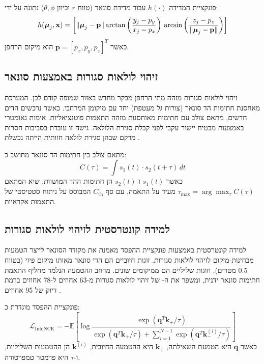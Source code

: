 פונקציית המדידה $h(\cdot)$ עבור מדידת סונאר (טווח $r$ וכיוון $\theta, \phi$) נתונה על ידי:
\begin{equation}
h(\boldsymbol{\mu}_j, \mathbf{x}) = \left[\| \boldsymbol{\mu}_j - \mathbf{p} \| \\ \arctan\left( \frac{y_j - p_y}{x_j - p_x} \right) \\ \arcsin\left( \frac{z_j - p_z}{\| \boldsymbol{\mu}_j - \mathbf{p} \|} \right)\right]
\label{eq:ch04_measurement_function}
\end{equation}
כאשר $\mathbf{p} = [p_x, p_y, p_z]^T$ הוא מיקום הרחפן.

\subsection{זיהוי לולאות סגורות באמצעות סונאר}
\label{sec:ch04_loop_closure}

זיהוי לולאות סגורות מזהה מתי הרחפן מבקר מחדש באזור שמופה קודם לכן. המערכת מאחסנת חתימות הד סונאר (צורות גל מעטפת) יחד עם מיקומן המרחבי. כאשר נרכשים הדים חדשים, מתאם צולב עם חתימות מאוחסנות מזהה התאמות פוטנציאליות. אימות גאומטרי באמצעות  מבטיח יישור עקבי לפני קבלת סגירת הלולאה. גישה זו עובדת בסביבות חסרות מרקם שבהן סגירת לולאה חזותית הייתה נכשלת \cite{Vanderelst2016PlaceRecognition}.

מתאם צולב בין חתימות הד סונאר מחושב כ:
\begin{equation}
C(\tau) = \int s_1(t) \cdot s_2(t + \tau) \, dt
\label{eq:ch04_cross_correlation}
\end{equation}
כאשר $s_1(t)$ ו-$s_2(t)$ הן חתימות ההד המושוות. שיא המתאם $\tau_{\text{max}} = \arg\max_\tau C(\tau)$ מעיד על התאמה, עם סף $C_{\text{th}}$ המבוסס על ניתוח סטטיסטי של התאמות אקראיות.

\subsection{למידה קונטרסטית לזיהוי לולאות סגורות}
\label{sec:ch04_contrastive_learning}

למידה קונטרסטית באמצעות פונקציית ההפסד  מאמנת את מקודד הסונאר לייצר הטמעות מבחינות-מיקום לזיהוי לולאות סגורות. זוגות חיוביים הם הדי סונאר מאותו מיקום פיזי (בטווח 0.5 מטרים), וזוגות שליליים הם ממיקומים שונים. מרחב ההטמעה הנלמד מחליף התאמת חתימות סונאר ידנית, ומשפר את ה- של זיהוי לולאות סגורות מ-63 אחוזים ל-78 אחוזים ברמת דיוק של 95 אחוזים \cite{CrewAIDocs}.

פונקציית ההפסד  מוגדרת כ:
\begin{equation}
\mathcal{L}_{\text{InfoNCE}} = -\mathbb{E} \left[ \log \frac{\exp(\mathbf{q}^T \mathbf{k}_+ / \tau)}{\exp(\mathbf{q}^T \mathbf{k}_+ / \tau) + \sum_{i=1}^{N-1} \exp(\mathbf{q}^T \mathbf{k}_-^{(i)} / \tau)} \right]
\label{eq:ch04_infonce}
\end{equation}
כאשר $\mathbf{q}$ היא הטמעת השאילתה, $\mathbf{k}_+$ היא ההטמעה החיובית, $\mathbf{k}_-^{(i)}$ הן ההטמעות השליליות, ו-$\tau$ היא פרמטר טמפרטורה.

